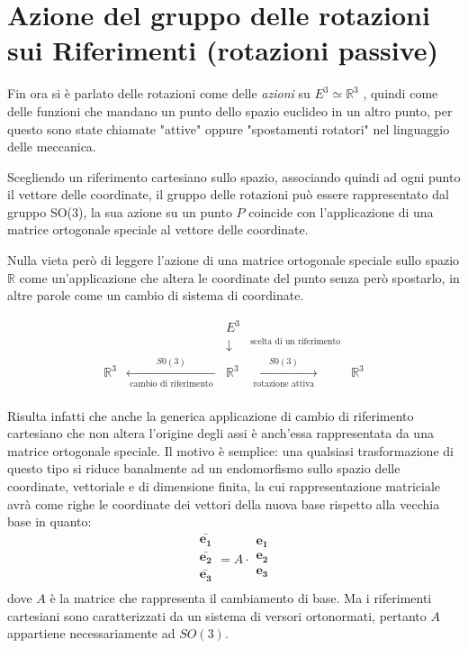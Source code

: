 \documentclass[11pt]{report}
\theoremstyle{plain}
\theoremstyle{definition}
\theoremstyle{remark}
\begin{document}
\section{Azione del gruppo delle rotazioni sui Riferimenti (rotazioni passive)}

Fin ora si è parlato delle rotazioni come delle \emph{azioni} su $ E^{3} \simeq \mathbb{R}^{3}$ , quindi come delle funzioni che mandano un punto dello spazio euclideo in un altro punto, per questo sono state chiamate "attive" oppure "spostamenti rotatori" nel linguaggio delle meccanica.

Scegliendo un riferimento cartesiano sullo spazio, associando quindi ad ogni punto il vettore delle coordinate,  il gruppo delle rotazioni può essere rappresentato dal gruppo SO(3), la sua azione su un punto $P$ coincide con l'applicazione di una matrice ortogonale speciale al vettore delle coordinate.

Nulla vieta però di leggere l'azione di una matrice ortogonale speciale sullo spazio $\mathbb{R}$ come un'applicazione che altera le coordinate del punto senza però spostarlo, in altre parole come un cambio di sistema di coordinate.

\begin{displaymath}
\begin{array}{ccccc}
 &  & E^{3} &  & \\
 & &\downarrow & ^{\textrm{scelta di un riferimento}}&\\
 \mathbb{R}^{3} &  \xleftarrow[\textrm{  cambio di riferimento  }]{S0(3)} & \mathbb{R}^{3} & \xrightarrow[\textrm{ rotazione attiva }]{S0(3)} & \mathbb{R}^{3}\\

\end{array}
\end{displaymath}


Risulta infatti che anche la generica applicazione di cambio di riferimento cartesiano che non altera l'origine degli assi è anch'essa rappresentata da una matrice ortogonale speciale. Il motivo è semplice: una qualsiasi trasformazione di questo tipo si riduce banalmente ad un endomorfismo sullo spazio delle coordinate, vettoriale e di dimensione finita, la cui rappresentazione matriciale avrà come righe le coordinate dei vettori della nuova base rispetto alla vecchia base in quanto:
\begin{equation}\label{eq:azionedestrariferimenti}
\begin{array}{|c|}
 \bar{\mathbf{e_{1}}} \\
 \bar{\mathbf{e_{2}}}\\
 \bar{\mathbf{e_{3}}}\\
\end{array} = A \cdot \begin{array}{|c|}
 \mathbf{e_{1}} \\
 \mathbf{e_{2}}\\
 \mathbf{e_{3}}\\
\end{array}
\end{equation}
dove $A$ è la matrice che rappresenta il cambiamento di base.
Ma i riferimenti cartesiani sono caratterizzati da un sistema di versori ortonormati, pertanto $A$ appartiene necessariamente ad $SO(3)$.
\end{document}
